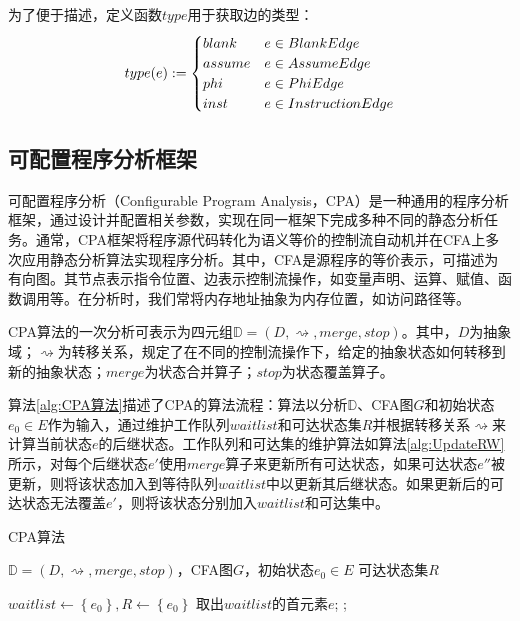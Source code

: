 为了便于描述，定义函数$ type $用于获取边的类型：
\begin{align}{\label{align:edgeType}}
	type(e) := \begin{cases}
		blank & e \in BlankEdge\\
		assume & e \in AssumeEdge\\
		phi & e \in PhiEdge\\
		inst & e \in InstructionEdge
	\end{cases}
\end{align}

\subsection{可配置程序分析框架} 

可配置程序分析（Configurable Program Analysis，CPA）是一种通用的程序分析框架，通过设计并配置相关参数，实现在同一框架下完成多种不同的静态分析任务。通常，CPA框架将程序源代码转化为语义等价的控制流自动机并在CFA上多次应用静态分析算法实现程序分析。其中，CFA是源程序的等价表示，可描述为有向图。其节点表示指令位置、边表示控制流操作，如变量声明、运算、赋值、函数调用等。在分析时，我们常将内存地址抽象为内存位置，如访问路径\cite{cheng2000modular}等。

CPA算法的一次分析可表示为四元组$ \mathbb{D} = (D, \rightsquigarrow, merge, stop) $。其中，$ D $为抽象域；$ \rightsquigarrow $为转移关系，规定了在不同的控制流操作下，给定的抽象状态如何转移到新的抽象状态；$ merge $为状态合并算子；$ stop $为状态覆盖算子。

算法\ref{alg:CPA算法}描述了CPA的算法流程：算法以分析$ \mathbb{D}$、CFA图$ G $和初始状态$ e_0 \in E $作为输入，通过维护工作队列$ waitlist $和可达状态集$ R $并根据转移关系$ \rightsquigarrow $来计算当前状态$ e $的后继状态。工作队列和可达集的维护算法如算法\ref{alg:UpdateRW}所示，对每个后继状态$ e' $使用$ merge $算子来更新所有可达状态，如果可达状态$ e'' $被更新，则将该状态加入到等待队列$ waitlist $中以更新其后继状态。如果更新后的可达状态无法覆盖$ e' $，则将该状态分别加入$ waitlist $和可达集中。

\begin{breakablealgorithm}
	\caption{CPA算法}
	\label{alg:CPA算法}
	\begin{algorithmic}[1]
		
		\Require $ \mathbb{D} = (D, \rightsquigarrow, merge, stop) $，CFA图$ G $，初始状态$ e_0 \in E $
		\Ensure 可达状态集$ R $
		
		\State $ waitlist \gets \left\{ e_0 \right\} , R \gets \left\{ e_0 \right\}$
			\State 取出$ waitlist $的首元素$ e $;
				\State {};
			\EndFor
		\EndWhile
		
	\end{algorithmic}
\end{breakablealgorithm}

